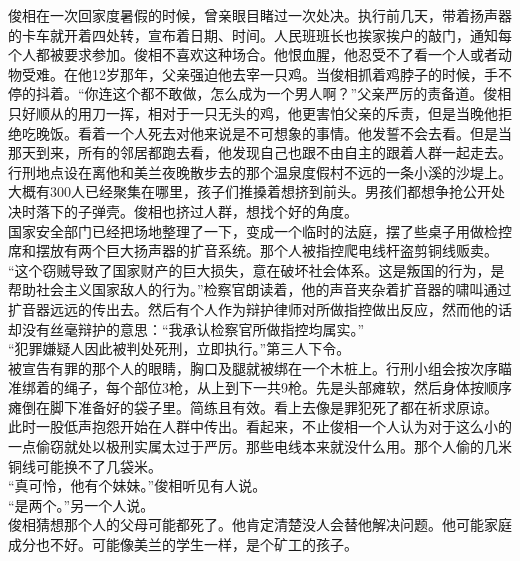 \ifnum{}
	\begin{multicols}{\theparacolNo}
\fi
俊相在一次回家度暑假的时候，曾亲眼目睹过一次处决。执行前几天，带着扬声器的卡车就开着四处转，宣布着日期、时间。人民班班长也挨家挨户的敲门，通知每个人都被要求参加。俊相不喜欢这种场合。他恨血腥，他忍受不了看一个人或者动物受难。在他12岁那年，父亲强迫他去宰一只鸡。当俊相抓着鸡脖子的时候，手不停的抖着。“你连这个都不敢做，怎么成为一个男人啊？”父亲严厉的责备道。俊相只好顺从的用刀一挥，相对于一只无头的鸡，他更害怕父亲的斥责，但是当晚他拒绝吃晚饭。看着一个人死去对他来说是不可想象的事情。他发誓不会去看。但是当那天到来，所有的邻居都跑去看，他发现自己也跟不由自主的跟着人群一起走去。行刑地点设在离他和美兰夜晚散步去的那个温泉度假村不远的一条小溪的沙堤上。大概有300人已经聚集在哪里，孩子们推搡着想挤到前头。男孩们都想争抢公开处决时落下的子弹壳。俊相也挤过人群，想找个好的角度。\\

国家安全部门已经把场地整理了一下，变成一个临时的法庭，摆了些桌子用做检控席和摆放有两个巨大扬声器的扩音系统。那个人被指控爬电线杆盗剪铜线贩卖。\\

“这个窃贼导致了国家财产的巨大损失，意在破坏社会体系。这是叛国的行为，是帮助社会主义国家敌人的行为。”检察官朗读着，他的声音夹杂着扩音器的啸叫通过扩音器远远的传出去。然后有个人作为辩护律师对所做指控做出反应，然而他的话却没有丝毫辩护的意思：“我承认检察官所做指控均属实。”\\

“犯罪嫌疑人因此被判处死刑，立即执行。”第三人下令。\\

被宣告有罪的那个人的眼睛，胸口及腿就被绑在一个木桩上。行刑小组会按次序瞄准绑着的绳子，每个部位3枪，从上到下一共9枪。先是头部瘫软，然后身体按顺序瘫倒在脚下准备好的袋子里。简练且有效。看上去像是罪犯死了都在祈求原谅。\\

此时一股低声抱怨开始在人群中传出。看起来，不止俊相一个人认为对于这么小的一点偷窃就处以极刑实属太过于严厉。那些电线本来就没什么用。那个人偷的几米铜线可能换不了几袋米。\\

“真可怜，他有个妹妹。”俊相听见有人说。\\

“是两个。”另一个人说。\\

俊相猜想那个人的父母可能都死了。他肯定清楚没人会替他解决问题。他可能家庭成分也不好。可能像美兰的学生一样，是个矿工的孩子。\\


\end{multicols}
